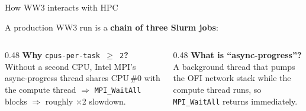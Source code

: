 \documentclass[aspectratio=169,10pt]{beamer}
\begin{document}
\begin{frame}[shrink=10]{How WW3 interacts with HPC}

  A production WW3 run is a \textbf{chain of three Slurm jobs}:

  \vspace{0.3em}
  \begin{center}
  \end{center}

  \vspace{0.2em}
  \begin{columns}[T]
    \begin{column}{0.48\textwidth}
      \textbf{Why} \texttt{cpus-per-task $\geq$ 2}\textbf{?}\\[3pt]
      Without a second CPU, Intel MPI's async-progress thread shares CPU\,\#0
      with the compute thread $\Rightarrow$ \texttt{MPI\_WaitAll} blocks
      $\Rightarrow$ roughly $\times$2 slowdown.
    \end{column}
    \begin{column}{0.48\textwidth}
      \textbf{What is ``async-progress''?}\\[3pt]
      A background thread that pumps the OFI network stack while the compute
      thread runs, so \texttt{MPI\_WaitAll} returns immediately.
    \end{column}
  \end{columns}
\end{frame}
\end{document}
